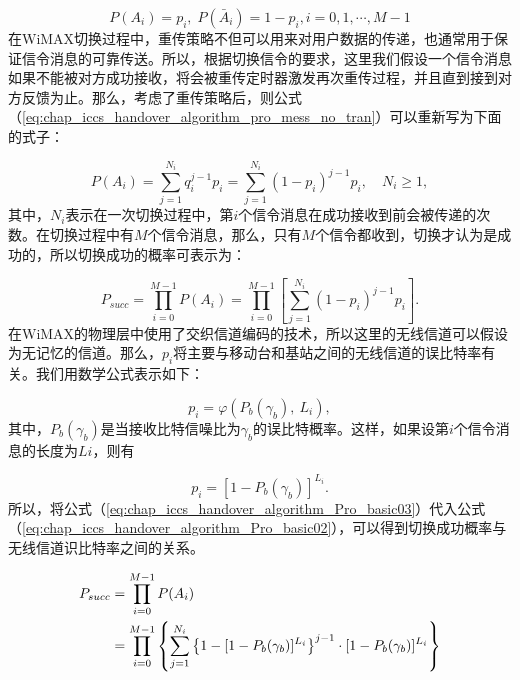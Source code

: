 \begin{equation}
\label{eq:chap_iccs_handover_algorithm_pro_mess_no_tran}
P(A_{i})=p_{i},\; P(\bar{A}_{i})=1- p_{i}, i=0,1,\cdots,M-1
\end{equation}
在WiMAX切换过程中，重传策略不但可以用来对用户数据的传递，也通常用于保证信令消息的可靠传送。所以，根据切换信令的要求，这里我们假设一个信令消息如果不能被对方成功接收，将会被重传定时器激发再次重传过程，并且直到接到对方反馈为止。那么，考虑了重传策略后，则公式 （\ref{eq:chap_iccs_handover_algorithm_pro_mess_no_tran}）可以重新写为下面的式子：

\begin{equation}
\label{eq:chap_iccs_handover_algorithm_Pro_basic01}
P(A_{i})=\sum_{j=1}^{N_{i}}q_{i}^{j-1}p_{i}=\sum_{j=1}^{N_{i}}
(1-p_{i})^{j-1}p_{i},\quad N_{i}\geq1,
\end{equation}
其中，$N_i$表示在一次切换过程中，第$i$个信令消息在成功接收到前会被传递的次数。在切换过程中有$M$个信令消息，那么，只有$M$个信令都收到，切换才认为是成功的，所以切换成功的概率可表示为：

\begin{equation}
\label{eq:chap_iccs_handover_algorithm_Pro_basic02}
P_{succ}=\prod_{i=0}^{M-1}P(A_{i})=\prod_{i=0}^{M-1}
\left[\sum_{j=1}^{N_{i}}(1-p_{i})^{j-1}p_{i}\right].
\end{equation}
在WiMAX的物理层中使用了交织信道编码的技术，所以这里的无线信道可以假设为无记忆的信道。那么，$p_i$将主要与移动台和基站之间的无线信道的误比特率有关。我们用数学公式表示如下：

$$
p_{i}=\varphi(P_{b}(\gamma_{b}),\: L_{i}),
$$
其中，$P_b(\gamma_b)$是当接收比特信噪比为$\gamma_b$的误比特概率。这样，如果设第$i$个信令消息的长度为$Li$，则有

\begin{equation}\label{eq:chap_iccs_handover_algorithm_Pro_basic03}
p_{i}=[1-P_{b}(\gamma_{b})]^{L_{i}}.
\end{equation}
所以，将公式（\ref{eq:chap_iccs_handover_algorithm_Pro_basic03}）代入公式（\ref{eq:chap_iccs_handover_algorithm_Pro_basic02}），可以得到切换成功概率与无线信道识比特率之间的关系。

\begin{align}
\label{eq:chap_iccs_handover_algorithm_Pro_basic_final}
\notag P_{succ}&=\prod_{i=0}^{M-1}P(A_{i})\\
&=\prod_{i=0}^{M-1}\left\{ \sum_{j=1}^{N_{i}}\left\{ 1-[1-P_{b}(\gamma_{b})]^{L_{i}}\right\} ^{j-1} \cdot[1-P_{b}(\gamma_{b})]^{L_{i}}\right\}
\end{align}

